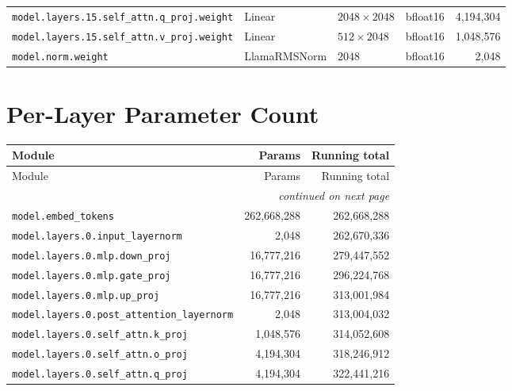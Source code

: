 \documentclass[10pt,a4paper]{article}
\theoremstyle{definition}
\begin{document}
\begin{appendices}
{\begin{longtable}{p{6.8cm}>{\raggedright\arraybackslash}p{3.3cm}llr}
\texttt{model.\allowbreak{}layers.\allowbreak{}15.\allowbreak{}self\_attn.\allowbreak{}q\_proj.\allowbreak{}weight} & Linear & $2048 \times 2048$ & bfloat16 & 4,194,304 \\
\texttt{model.\allowbreak{}layers.\allowbreak{}15.\allowbreak{}self\_attn.\allowbreak{}v\_proj.\allowbreak{}weight} & Linear & $512 \times 2048$ & bfloat16 & 1,048,576 \\
\texttt{model.\allowbreak{}norm.\allowbreak{}weight} & Llama\allowbreak{}RMSNorm & $2048$ & bfloat16 & 2,048 \\
\end{longtable}
}
\section{Per-Layer Parameter Count}
\begin{longtable}{p{9.5cm}rr}
\toprule
Module & Params & Running total \\
\midrule
\endfirsthead
\toprule
Module & Params & Running total \\
\midrule
\endhead
\midrule \multicolumn{3}{r}{\textit{continued on next page}} \\
\endfoot
\bottomrule
\endlastfoot
\texttt{model.\allowbreak{}embed\_tokens} & 262,668,288 & 262,668,288 \\
\texttt{model.\allowbreak{}layers.\allowbreak{}0.\allowbreak{}input\_layernorm} & 2,048 & 262,670,336 \\
\texttt{model.\allowbreak{}layers.\allowbreak{}0.\allowbreak{}mlp.\allowbreak{}down\_proj} & 16,777,216 & 279,447,552 \\
\texttt{model.\allowbreak{}layers.\allowbreak{}0.\allowbreak{}mlp.\allowbreak{}gate\_proj} & 16,777,216 & 296,224,768 \\
\texttt{model.\allowbreak{}layers.\allowbreak{}0.\allowbreak{}mlp.\allowbreak{}up\_proj} & 16,777,216 & 313,001,984 \\
\texttt{model.\allowbreak{}layers.\allowbreak{}0.\allowbreak{}post\_attention\_layernorm} & 2,048 & 313,004,032 \\
\texttt{model.\allowbreak{}layers.\allowbreak{}0.\allowbreak{}self\_attn.\allowbreak{}k\_proj} & 1,048,576 & 314,052,608 \\
\texttt{model.\allowbreak{}layers.\allowbreak{}0.\allowbreak{}self\_attn.\allowbreak{}o\_proj} & 4,194,304 & 318,246,912 \\
\texttt{model.\allowbreak{}layers.\allowbreak{}0.\allowbreak{}self\_attn.\allowbreak{}q\_proj} & 4,194,304 & 322,441,216 \\

\end{longtable}
\end{appendices}
\end{document}
